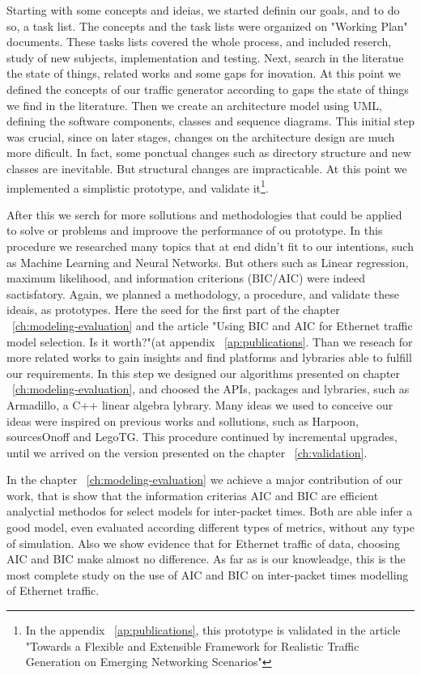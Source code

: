 Starting with some concepts and ideias, we started definin our goals, and to do so, a task list. The concepts and the task lists were organized on "Working Plan" documents. These tasks lists covered the whole process, and included reserch, study of new subjects, implementation and testing. Next, search in the literatue the state of things, related works and some gaps for inovation. At this point we defined the concepts of our traffic generator according to gaps the state of things we find in the literature. Then we create an architecture model using UML, defining the software components, classes and sequence diagrams. This initial step was crucial, since on later stages, changes on the architecture design are much more dificult. In fact, some ponctual changes such as directory structure and new classes are inevitable. But structural changes are impracticable. At this point we implemented a simplistic prototype, and validate it\footnote{In the appendix ~\ref{ap:publications}, this prototype is validated in the article "Towards a Flexible and Extensible Framework for Realistic Traffic Generation on Emerging Networking Scenarios"}. 

After this we serch for more sollutions and methodologies that could be applied to solve or problems and improove the performance of ou prototype. In this procedure we researched many topics that at end didn't fit to our intentions, such as Machine Learning and Neural Networks. But others such as Linear regression, maximum likelihood, and information criterions (BIC/AIC) were indeed sactisfatory. Again, we planned a methodology, a procedure, and validate these ideais, as prototypes. Here the seed for the first part of the chapter ~\ref{ch:modeling-evaluation} and the article "Using BIC and AIC for Ethernet traffic model selection. Is it worth?"(at appendix ~\ref{ap:publications}. Than we reseach for more related works to  gain insights and find platforms and lybraries able to fulfill our requirements. In this step we designed our algorithms presented on chapter ~\ref{ch:modeling-evaluation}, and choosed the APIs, packages and lybraries, such as Armadillo\cite{armadillo}, a C++ linear algebra lybrary. Many ideas we used to conceive our ideas were inspired on previous works and sollutions, such as Harpoon\cite{harpoon-validation}, sourcesOnoff \cite{sourcesonoff-paper} and LegoTG\cite{legotg-paper}. This procedure continued by incremental upgrades, until we arrived on the version presented on the chapter ~\ref{ch:validation}. 


In the chapter ~\ref{ch:modeling-evaluation} we achieve a major contribution of our work, that is show that the information criterias AIC and BIC are efficient analyctial methodos for select models for inter-packet times. Both are able infer a good model, even evaluated according different types of metrics, without any type of simulation. Also we show evidence that for Ethernet traffic of data, choosing AIC and BIC make almost no difference. As far as is our knowleadge, this is the most complete study on the use of AIC and BIC on inter-packet times modelling of Ethernet traffic.



